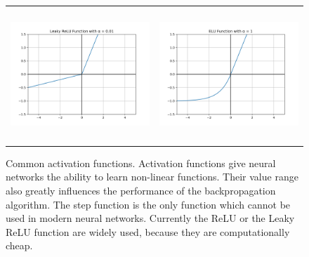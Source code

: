 \begin{figure}[t!]
\begin{center}
{\begin{tabular}{cc}
  \includegraphics[clip, height=5cm]{figures/deeplearning/af_LeakyReLU.png} & 
  \includegraphics[clip, height=5cm]{figures/deeplearning/af_ELU.png} \\
  
  \end{tabular}
  }%
  \end{center}
  \caption[Activation Functions]{Common activation functions. Activation functions give neural networks the ability to learn non-linear functions. Their value range also greatly influences the performance of the backpropagation algorithm. The step function is the only function which cannot be used in modern neural networks. Currently the ReLU or the Leaky ReLU function are widely used, because they are computationally cheap.}
  \label{fig:ActivationFunctions}
\end{figure}

